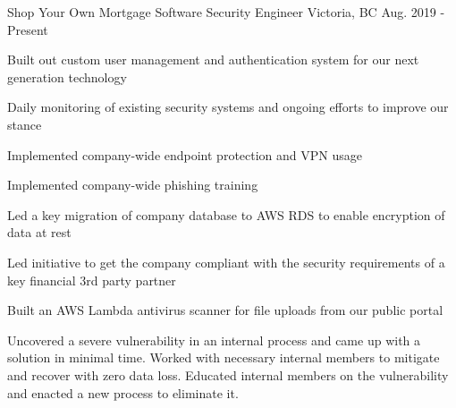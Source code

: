 


\begin{cventries}


\cventry
{Shop Your Own Mortgage} %
{Software Security Engineer} %
{Victoria, BC} %
{Aug. 2019 - Present} %
{ %
\begin{cvitems}
\item {Built out custom user management and authentication system for our next generation technology}
\item {Daily monitoring of existing security systems and ongoing efforts to improve our stance}
\item {Implemented company-wide endpoint protection and VPN usage}
\item {Implemented company-wide phishing training}
\item {Led a key migration of company database to AWS RDS to enable encryption of data at rest}
\item {Led initiative to get the company compliant with the security requirements of a key financial 3rd party partner}
\item {Built an AWS Lambda antivirus scanner for file uploads from our public portal}
\item {Uncovered a severe vulnerability in an internal process and came up with a solution in minimal time. Worked with necessary internal members to mitigate and recover with zero data loss. Educated internal members on the vulnerability and enacted a new process to eliminate it. }
\end{cvitems}
}



\end{cventries}
